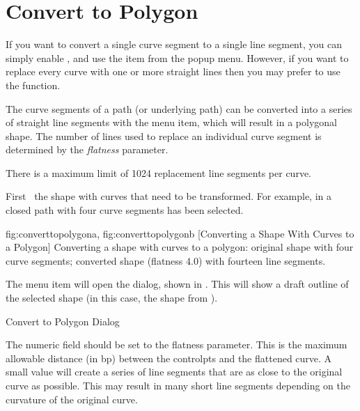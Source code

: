 \section{Convert to Polygon}\label{sec:converttopolygon}

If you want to convert a single \gls{curve} segment to a single
line segment, you can simply enable \editpathmode, and use the 
 item from the popup menu.
However, if you want to replace every curve with one or more straight
lines then you may prefer to use the 
function.


The \gls{curve} segments of a \gls{path} (or underlying path)
can be converted into a series of straight line segments with the
 menu item, which will result in
a polygonal shape. The number of lines used to replace an individual
curve segment is determined by the \emph{flatness} parameter.

\begin{information}
There is a maximum limit of 1024 replacement line segments per
\gls{curve}.
\end{information}

First \select\ the \gls{shape} with \glspl{curve} that need to be transformed.
For example, in  a closed \gls{path}
with four \gls{curve} segments has been selected.

{
  {fig:converttopolygona}{}{},
  {fig:converttopolygonb}{}{}
}
[Converting a Shape With Curves to a Polygon]
{Converting a shape with curves to a polygon:
 original shape with four
curve segments;
 converted shape (flatness 4.0) 
with fourteen line segments.}



The  menu item will open the
 dialog, shown in .
This will show a draft outline of the selected shape (in this case,
the shape from ).

{}
{Convert to Polygon Dialog}


The  numeric field should be set to the
flatness parameter. This is the maximum allowable distance (in \gls{bp})
between the \glspl{controlpt} and the flattened \gls{curve}. A small
value will create a series of line segments that are as close to the
original curve as possible. This may result in many short line
segments depending on the curvature of the original \gls{curve}.

